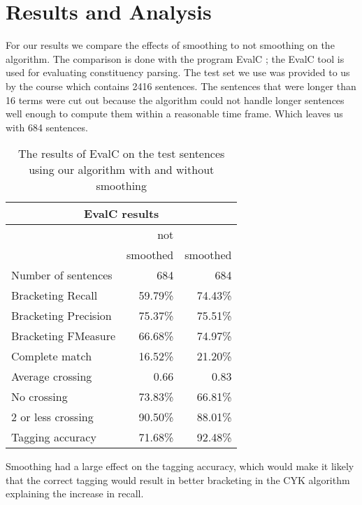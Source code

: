 \documentclass[11pt,twocolumn]{article}
\begin{document}



\section{Results and Analysis}
For our results we compare the effects of smoothing to not smoothing on the algorithm. The comparison is done with the program EvalC \cite{evalc}; the EvalC tool is used for evaluating constituency parsing. The test set we use was provided to us by the course which contains 2416 sentences. The sentences that were longer than 16 terms were cut out because the algorithm could not handle longer sentences well enough to compute them within a reasonable time frame. Which leaves us with 684 sentences.

\begin{table}[!htb]
\centering
\begin{tabular}{|l|r|r|}
\hline
\multicolumn{3}{|c|}{EvalC results}\\
\hline
& not  & \\
& smoothed & smoothed  \\
\hline
Number of sentences     & 684 & 684 \\
Bracketing Recall         &  59.79\% & 74.43\% \\
Bracketing Precision      &  75.37\% & 75.51\% \\
Bracketing FMeasure       &  66.68\% & 74.97\% \\
Complete match            &  16.52\% & 21.20\% \\
Average crossing          &   0.66 & 0.83 \\
No crossing               &  73.83\% & 66.81\% \\
2 or less crossing        &  90.50\% & 88.01\% \\
Tagging accuracy          &  71.68\% & 92.48\% \\
\hline
\end{tabular}
\caption{The results of EvalC on the test sentences using our algorithm with and without smoothing}
\label{tab:results}
\end{table}

Smoothing had a large effect on the tagging accuracy, which would make it likely that the correct tagging would result in better bracketing in the CYK algorithm explaining the increase in recall.

\end{document}
